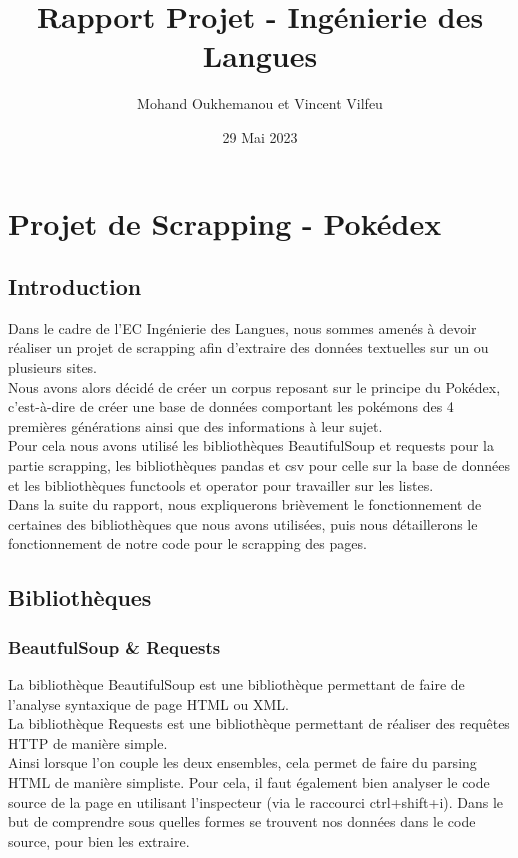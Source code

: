 \documentclass[a4paper, titlepage]{report}
\title{Rapport Projet - Ingénierie des Langues}
\author{Mohand Oukhemanou et Vincent Vilfeu}
\date{29 Mai 2023}
\begin{document}
\maketitle
\chapter*{Projet de Scrapping - Pokédex}
\section*{Introduction}

\textnormal{Dans le cadre de l’EC Ingénierie des Langues, nous sommes amenés à devoir réaliser un projet de scrapping afin d'extraire des données textuelles sur un ou plusieurs sites.\\
Nous avons alors décidé de créer un corpus reposant sur le principe du Pokédex, c'est-à-dire de créer une base de données comportant les pokémons des 4 premières générations ainsi que des informations à leur sujet.\\
Pour cela nous avons utilisé les bibliothèques BeautifulSoup et requests pour la partie scrapping, les bibliothèques pandas et csv pour celle sur la base de données et les bibliothèques functools et operator pour travailler sur les listes.\\
Dans la suite du rapport, nous expliquerons brièvement le fonctionnement de certaines des bibliothèques que nous avons utilisées, puis nous détaillerons le fonctionnement de notre code pour le scrapping des pages.\\}


\section*{Bibliothèques}

\subsection*{BeautfulSoup \& Requests}
\textnormal{La bibliothèque BeautifulSoup est une bibliothèque permettant de faire de l'analyse syntaxique de page HTML ou XML.\\
La bibliothèque Requests est une bibliothèque permettant de réaliser des requêtes HTTP de manière simple.\\
Ainsi lorsque l'on couple les deux ensembles, cela permet de faire du parsing HTML de manière simpliste. Pour cela, il faut également bien analyser le code source de la page en utilisant l'inspecteur (via le raccourci ctrl+shift+i). Dans le but de comprendre sous quelles formes se trouvent nos données dans le code source, pour bien les extraire.}
\end{document}
